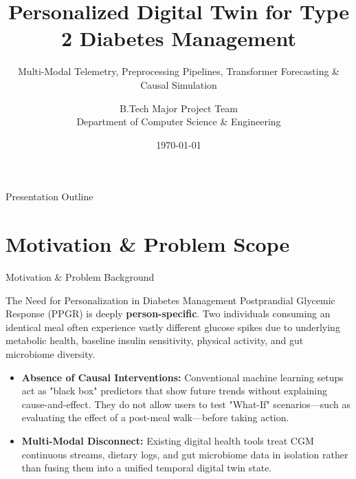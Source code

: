 \documentclass[10pt,aspectratio=169]{beamer}
\title[Digital Twin for T2D — Progress Review]{\textbf{Personalized Digital Twin for Type 2 Diabetes Management}}
\subtitle{Multi-Modal Telemetry, Preprocessing Pipelines, Transformer Forecasting \& Causal Simulation}
\author[B.Tech Major Project]{B.Tech Major Project Team\\[2pt]
  \small Department of Computer Science \& Engineering}
\date{\today}
\begin{document}

\begin{frame}
    \titlepage
\end{frame}

\begin{frame}{Presentation Outline}
    \tableofcontents
\end{frame}

\section{Motivation \& Problem Scope}

\begin{frame}{Motivation \& Problem Background}
    \justifying
    \begin{block}{The Need for Personalization in Diabetes Management}
        Postprandial Glycemic Response (PPGR) is deeply \textbf{person-specific}. Two individuals consuming an identical meal often experience vastly different glucose spikes due to underlying metabolic health, baseline insulin sensitivity, physical activity, and gut microbiome diversity.
    \end{block}
    
    \vspace{0.2cm}
    \begin{itemize}
        \justifying
        \item \textbf{Absence of Causal Interventions:} Conventional machine learning setups act as "black box" predictors that show future trends without explaining cause-and-effect. They do not allow users to test "What-If" scenarios—such as evaluating the effect of a post-meal walk—before taking action.
        \item \textbf{Multi-Modal Disconnect:} Existing digital health tools treat CGM continuous streams, dietary logs, and gut microbiome data in isolation rather than fusing them into a unified temporal digital twin state.
    \end{itemize}
\end{frame}
\end{document}
